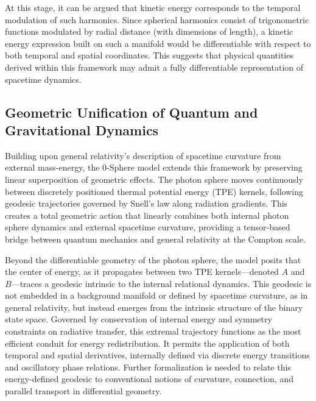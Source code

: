 \documentclass[%
 reprint,
 amsmath,amssymb,
 aps,
]{revtex4-1}
\numberwithin{equation}{section}%
\begin{document}
At this stage, it can be argued that kinetic energy corresponds to the temporal modulation of such harmonics. Since spherical harmonics consist of trigonometric functions modulated by radial distance (with dimensions of length), a kinetic energy expression built on such a manifold would be differentiable with respect to both temporal and spatial coordinates. This suggests that physical quantities derived within this framework may admit a fully differentiable representation of spacetime dynamics.

\subsection{Geometric Unification of Quantum and Gravitational Dynamics}
\label{subsec:geometric_unification}

Building upon general relativity's description of spacetime curvature from external mass-energy, the 0-Sphere model extends this framework by preserving linear superposition of geometric effects. The photon sphere moves continuously between discretely positioned thermal potential energy (TPE) kernels, following geodesic trajectories governed by Snell's law along radiation gradients. This creates a total geometric action that linearly combines both internal photon sphere dynamics and external spacetime curvature, providing a tensor-based bridge between quantum mechanics and general relativity at the Compton scale.

Beyond the differentiable geometry of the photon sphere, the model posits that the center of energy, as it propagates between two TPE kernels—denoted $A$ and $B$—traces a geodesic intrinsic to the internal relational dynamics. This geodesic is not embedded in a background manifold or defined by spacetime curvature, as in general relativity, but instead emerges from the intrinsic structure of the binary state space. Governed by conservation of internal energy and symmetry constraints on radiative transfer, this extremal trajectory functions as the most efficient conduit for energy redistribution. It permits the application of both temporal and spatial derivatives, internally defined via discrete energy transitions and oscillatory phase relations. Further formalization is needed to relate this energy-defined geodesic to conventional notions of curvature, connection, and parallel transport in differential geometry.
\end{document}
